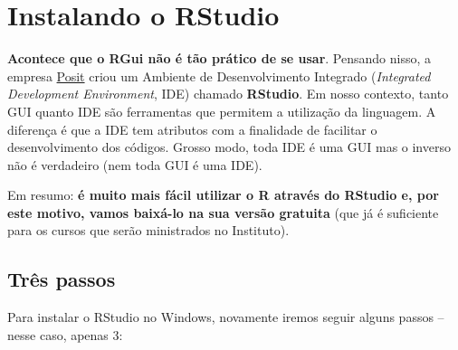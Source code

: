 \documentclass[
  letterpaper,
  DIV=11,
  numbers=noendperiod]{scrreprt}
\begin{document}
\chapter{Instalando o RStudio}\label{instalando-o-rstudio}

\textbf{Acontece que o RGui não é tão prático de se usar}. Pensando
nisso, a empresa \href{https://posit.co/}{Posit} criou um Ambiente de
Desenvolvimento Integrado (\emph{Integrated Development Environment},
IDE) chamado \textbf{RStudio}. Em nosso contexto, tanto GUI quanto IDE
são ferramentas que permitem a utilização da linguagem. A diferença é
que a IDE tem atributos com a finalidade de facilitar o desenvolvimento
dos códigos. Grosso modo, toda IDE é uma GUI mas o inverso não é
verdadeiro (nem toda GUI é uma IDE).

Em resumo: \textbf{é muito mais fácil utilizar o R através do RStudio e,
por este motivo, vamos baixá-lo na sua versão gratuita} (que já é
suficiente para os cursos que serão ministrados no Instituto).

\section{Três passos}\label{truxeas-passos}

Para instalar o RStudio no Windows, novamente iremos seguir alguns
passos -- nesse caso, apenas 3:
\end{document}
